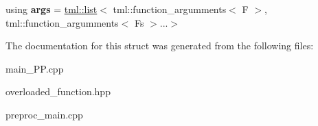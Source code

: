 \begin{DoxyCompactItemize}
\item 
\hypertarget{structtml_1_1impl_1_1function__signature_3_01tml_1_1runtime_1_1overloaded__function_3_01F_00_01Fs_8_8_8_4_01_4_a1ac0eab64a09914df2209b4d7b5618a1}{using {\bfseries args} = \hyperlink{structtml_1_1list}{tml\+::list}$<$ tml\+::function\+\_\+argumments$<$ F $>$, tml\+::function\+\_\+argumments$<$ Fs $>$...$>$}\label{structtml_1_1impl_1_1function__signature_3_01tml_1_1runtime_1_1overloaded__function_3_01F_00_01Fs_8_8_8_4_01_4_a1ac0eab64a09914df2209b4d7b5618a1}

\end{DoxyCompactItemize}


The documentation for this struct was generated from the following files\+:\begin{DoxyCompactItemize}
\item 
main\+\_\+\+P\+P.\+cpp\item 
overloaded\+\_\+function.\+hpp\item 
preproc\+\_\+main.\+cpp\end{DoxyCompactItemize}
